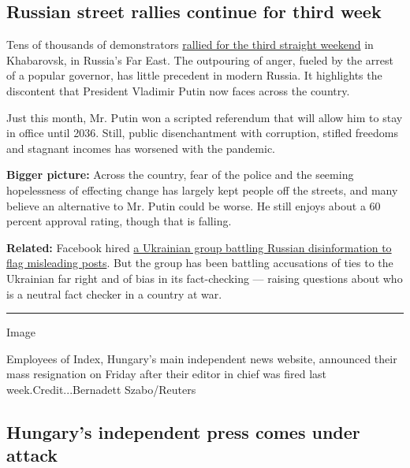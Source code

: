 \hypertarget{russian-street-rallies-continue-for-third-week}{%
\subsection{Russian street rallies continue for third
week}\label{russian-street-rallies-continue-for-third-week}}

Tens of thousands of demonstrators
\href{https://www.nytimes.com/2020/07/25/world/europe/russia-protests-putin-khabarovsk.html}{rallied
for the third straight weekend} in Khabarovsk, in Russia's Far East. The
outpouring of anger, fueled by the arrest of a popular governor, has
little precedent in modern Russia. It highlights the discontent that
President Vladimir Putin now faces across the country.

Just this month, Mr. Putin won a scripted referendum that will allow him
to stay in office until 2036. Still, public disenchantment with
corruption, stifled freedoms and stagnant incomes has worsened with the
pandemic.

\textbf{Bigger picture:} Across the country, fear of the police and the
seeming hopelessness of effecting change has largely kept people off the
streets, and many believe an alternative to Mr. Putin could be worse. He
still enjoys about a 60 percent approval rating, though that is falling.

\textbf{Related:} Facebook hired
\href{https://www.nytimes.com/2020/07/26/world/europe/ukraine-facebook-fake-news.html}{a
Ukrainian group battling Russian disinformation to flag misleading
posts}. But the group has been battling accusations of ties to the
Ukrainian far right and of bias in its fact-checking --- raising
questions about who is a neutral fact checker in a country at war.

\begin{center}\rule{0.5\linewidth}{\linethickness}\end{center}

Image

Employees of Index, Hungary's main independent news website, announced
their mass resignation on Friday after their editor in chief was fired
last week.Credit...Bernadett Szabo/Reuters

\hypertarget{hungarys-independent-press-comes-under-attack}{%
\subsection{Hungary's independent press comes under
attack}\label{hungarys-independent-press-comes-under-attack}}

